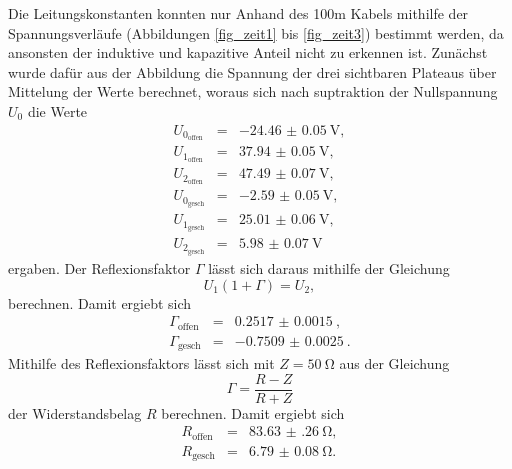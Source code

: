 Die Leitungskonstanten konnten nur Anhand des 100m Kabels mithilfe der Spannungsverläufe (Abbildungen \ref{fig_zeit1} bis \ref{fig_zeit3}) bestimmt werden, da ansonsten der induktive und kapazitive Anteil nicht zu erkennen ist.
Zunächst wurde dafür aus der Abbildung die Spannung der drei sichtbaren Plateaus über Mittelung der Werte berechnet, woraus sich nach suptraktion der Nullspannung $U_0$ die Werte
\begin{eqnarray*}
	U_{0_\text{offen}} &=& \SI{-24.46(5)}{\volt},\\
	U_{1_\text{offen}} &=& \SI{37.94(5)}{\volt},\\
	U_{2_\text{offen}} &=& \SI{47.49(7)}{\volt},\\
	U_{0_\text{gesch}} &=& \SI{-2.59(5)}{\volt},\\
	U_{1_\text{gesch}} &=& \SI{25.01(6)}{\volt},\\
	U_{2_\text{gesch}} &=& \SI{5.98(7)}{\volt}
\end{eqnarray*}
ergaben.
Der Reflexionsfaktor $\Gamma$ lässt sich daraus mithilfe der Gleichung
\begin{equation*}
	U_1 (1+\Gamma) = U_2,
\end{equation*}
 berechnen.
Damit ergiebt sich
\begin{eqnarray*}
	\Gamma_\text{offen} &=& \SI{0.2517(15)}{},\\
	\Gamma_\text{gesch} &=& \SI{-0.7509(25)}{}.
\end{eqnarray*}
Mithilfe des Reflexionsfaktors lässt sich mit $Z=\SI{50}{\ohm}$ aus der Gleichung
\begin{equation*}
	\Gamma = \frac{R-Z}{R+Z}
\end{equation*}
der Widerstandsbelag $R$ berechnen.
Damit ergiebt sich
\begin{eqnarray*}
	R_\text{offen} &=& \SI{83.63(26)}{\ohm},\\
	R_\text{gesch} &=& \SI{6.79(8)}{\ohm}.
\end{eqnarray*}

